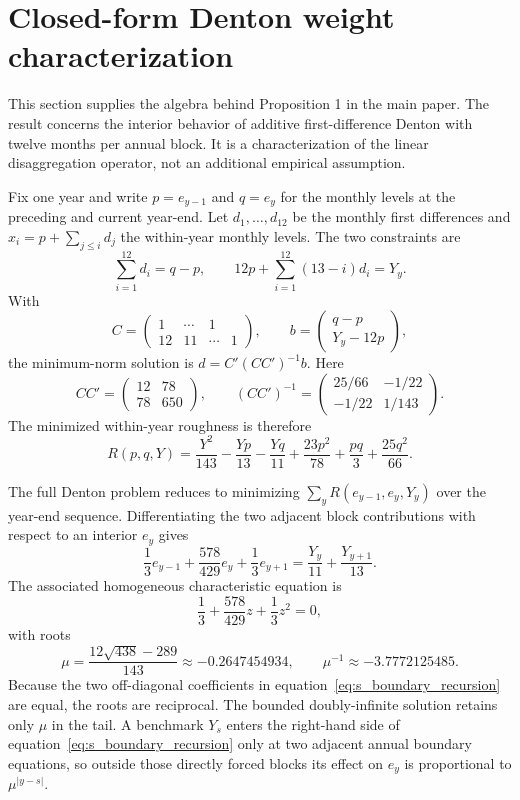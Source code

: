 \documentclass[12pt]{article}
\begin{document}
\section{Closed-form Denton weight characterization}
This section supplies the algebra behind Proposition 1 in the main paper. The result concerns the interior behavior of additive first-difference Denton with twelve months per annual block. It is a characterization of the linear disaggregation operator, not an additional empirical assumption.

Fix one year and write $p=e_{y-1}$ and $q=e_y$ for the monthly levels at the preceding and current year-end. Let $d_1,\ldots,d_{12}$ be the monthly first differences and $x_i=p+\sum_{j\leq i}d_j$ the within-year monthly levels. The two constraints are
\[
\sum_{i=1}^{12}d_i=q-p,
\qquad
12p+\sum_{i=1}^{12}(13-i)d_i=Y_y.
\]
With
\[
C=\begin{pmatrix}
1&\cdots&1\\
12&11&\cdots&1
\end{pmatrix},
\qquad
b=\begin{pmatrix}q-p\\Y_y-12p\end{pmatrix},
\]
the minimum-norm solution is $d=C'(CC')^{-1}b$. Here
\[
CC'=\begin{pmatrix}12&78\\78&650\end{pmatrix},
\qquad
(CC')^{-1}=\begin{pmatrix}25/66&-1/22\\-1/22&1/143\end{pmatrix}.
\]
The minimized within-year roughness is therefore
\begin{equation}
R(p,q,Y)
=\frac{Y^2}{143}-\frac{Yp}{13}-\frac{Yq}{11}
 +\frac{23p^2}{78}+\frac{pq}{3}+\frac{25q^2}{66}.
\label{eq:s_R}
\end{equation}

The full Denton problem reduces to minimizing $\sum_y R(e_{y-1},e_y,Y_y)$ over the year-end sequence. Differentiating the two adjacent block contributions with respect to an interior $e_y$ gives
\begin{equation}
\frac{1}{3}e_{y-1}+\frac{578}{429}e_y+\frac{1}{3}e_{y+1}
=\frac{Y_y}{11}+\frac{Y_{y+1}}{13}.
\label{eq:s_boundary_recursion}
\end{equation}
The associated homogeneous characteristic equation is
\[
\frac{1}{3}+\frac{578}{429}z+\frac{1}{3}z^2=0,
\]
with roots
\[
\mu=\frac{12\sqrt{438}-289}{143}\approx-0.2647454934,
\qquad
\mu^{-1}\approx-3.7772125485.
\]
Because the two off-diagonal coefficients in equation~\eqref{eq:s_boundary_recursion} are equal, the roots are reciprocal. The bounded doubly-infinite solution retains only $\mu$ in the tail. A benchmark $Y_s$ enters the right-hand side of equation~\eqref{eq:s_boundary_recursion} only at two adjacent annual boundary equations, so outside those directly forced blocks its effect on $e_y$ is proportional to $\mu^{|y-s|}$.
\end{document}

